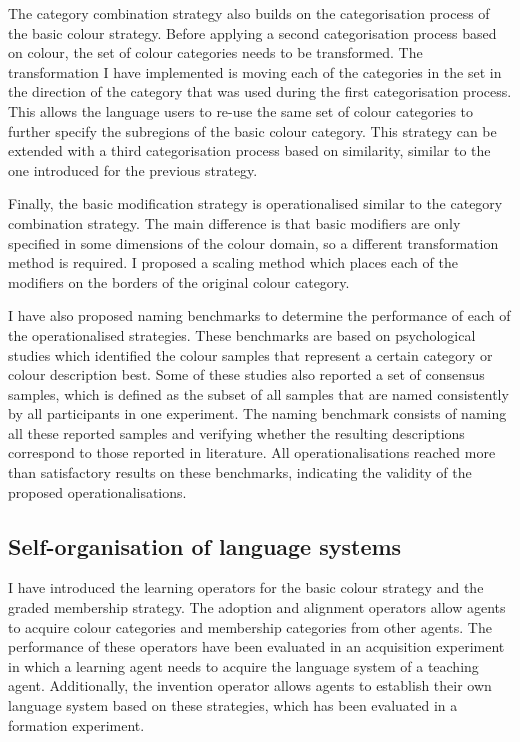 The category combination strategy also builds on the
categorisation process of the basic colour strategy. Before
applying a second categorisation process based on colour, the set of
colour categories needs to be transformed. The transformation I have
implemented is moving each of the categories in the set in the
direction of the category that was used during the first
categorisation process. This allows the language users to re-use the
same set of colour categories to further specify the subregions of the
basic colour category. This strategy can be extended with a third
categorisation process based on similarity, similar to the one
introduced for the previous strategy.

Finally, the basic modification strategy is
operationalised similar to the category combination
strategy. The main difference is that basic modifiers are only
specified in some dimensions of the colour domain, so a different
transformation method is required. I proposed a scaling method which
places each of the modifiers on the borders of the original colour
category.

I have also proposed naming benchmarks to determine the performance of each
of the operationalised strategies. These benchmarks are based on
psychological studies which identified the colour samples that
represent a certain category or colour description best. Some of these
studies also reported a set of consensus samples, which is defined as
the subset of all samples that are named consistently by all
participants in one experiment. The naming benchmark consists of
naming all these reported samples and verifying whether the resulting
descriptions correspond to those reported in literature. All
operationalisations reached more than satisfactory results on these
benchmarks, indicating the validity of the proposed
operationalisations.

\subsection{Self-organisation of language systems}

I have introduced the learning operators for the basic colour
  strategy and the graded membership strategy. The adoption
and alignment operators allow agents to acquire colour categories and
membership categories from other agents. The performance of these
operators have been evaluated in an acquisition experiment in which a
learning agent needs to acquire the language system of a teaching
agent. Additionally, the invention operator allows agents to establish
their own language system based on these strategies, which has been
evaluated in a formation experiment.

